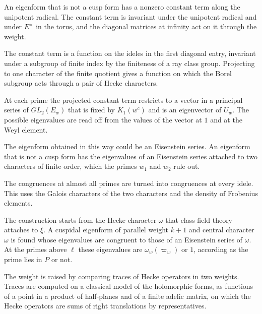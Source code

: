 An eigenform that is not a cusp form has a nonzero constant term along the unipotent radical. The constant term is invariant under the unipotent radical and under $E^\times$ in the torus, and the diagonal matrices at infinity act on it through the weight.

The constant term is a function on the ideles in the first diagonal entry, invariant under a subgroup of finite index by the finiteness of a ray class group. Projecting to one character of the finite quotient gives a function on which the Borel subgroup acts through a pair of Hecke characters.

At each prime the projected constant term restricts to a vector in a principal series of $GL_2(E_w)$ that is fixed by $K_1(w^c)$ and is an eigenvector of $U_w$. The possible eigenvalues are read off from the values of the vector at $1$ and at the Weyl element.

The eigenform obtained in this way could be an Eisenstein series. An eigenform that is not a cusp form has the eigenvalues of an Eisenstein series attached to two characters of finite order, which the primes $w_1$ and $w_2$ rule out.

The congruences at almost all primes are turned into congruences at every idele. This uses the Galois characters of the two characters and the density of Frobenius elements.

The construction starts from the Hecke character $\omega$ that class field theory attaches to $\xi$. A cuspidal eigenform of parallel weight $k+1$ and central character $\omega$ is found whose eigenvalues are congruent to those of an Eisenstein series of $\omega$. At the primes above $\ell$ these eigenvalues are $\omega_w(\varpi_w)$ or $1$, according as the prime lies in $P$ or not.

The weight is raised by comparing traces of Hecke operators in two weights. Traces are computed on a classical model of the holomorphic forms, as functions of a point in a product of half-planes and of a finite adelic matrix, on which the Hecke operators are sums of right translations by representatives.

